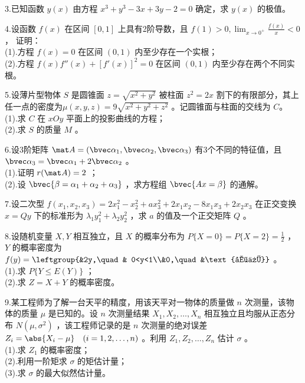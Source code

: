 3.已知函数 $y(x)$ 由方程 $x^3+y^3-3x+3y-2=0$  确定，求 $y(x)$ 的极值。

4.设函数  $f(x)$ 在区间 $[0,1]$  上具有2阶导数，且 $\displaystyle f(1)>0,\lim_{x \to 0^+}\frac{f(x)}{x}<0$ ，  证明：\\
(1).方程 $f(x)=0$  在区间 $(0,1)$ 内至少存在一个实根；\\
(2).方程 $f(x)f''(x)+[f'(x)]^2=0$ 在区间 $(0,1)$ 内至少存在两个不同实根。

5.设薄片型物体 $S$ 是圆锥面  $z=\sqrt{x^2+y^2}$ 被柱面 $z^2=2x$  割下的有限部分，其上任一点的密度为$\mu(x,y,z)=9\sqrt{x^2+y^2+z^2}$   。记圆锥面与柱面的交线为 $C$。\\
(1).求 $C$ 在 $xOy$  平面上的投影曲线的方程；\\
(2).求 $S$ 的质量 $M$ 。

6.设3阶矩阵 $\mat A=(\bvec \alpha_1,\bvec \alpha_2,\bvec \alpha_3)$  有3个不同的特征值，且 $\bvec \alpha_3=\bvec \alpha_1+2\bvec \alpha_2$ 。\\
(1).证明 $r(\mat A)=2$ ；\\
(2).设 $\bvec{\beta=\alpha_1+\alpha_2+\alpha_3}$  ，求方程组 $\bvec{Ax=\beta}$  的通解。

7.设二次型  $f(x_1,x_2,x_3)=2x_1^2-x_2^2+ax_3^2+2x_1x_2-8x_1x_3+2x_2x_3$ 在正交变换  $x=Qy$ 下的标准形为 $\lambda_1y_1^2+\lambda_2y_2^2$  ，求 $a$ 的值及一个正交矩阵 $Q$ 。

8.设随机变量 $X,Y$  相互独立，且 $X$  的概率分布为 $\displaystyle P\{X=0\}=P\{X=2\}=\frac{1}{2}$  ， $Y$ 的概率密度为 $f(y)=\leftgroup{&2y,\quad & 0<y<1\\&0,\quad &\text{其他}}$ 。\\
(1).求 $P\{Y \le E(Y)\}$ ；\\
(2).求 $Z=X+Y$ 的概率密度。

9.某工程师为了解一台天平的精度，用该天平对一物体的质量做 $n$ 次测量，该物体的质量 $\mu$ 是已知的。设 $n$ 次测量结果 $X_1,X_2,\dots,X_n$  相互独立且均服从正态分布 $N(\mu,\sigma^2)$ ，该工程师记录的是 $n$  次测量的绝对误差 $Z_i=\abs{X_i-\mu} \quad (i=1,2,\dots,n)$  。利用  $Z_1,Z_2,\dots,Z_n$ 估计 $\sigma$ 。\\
(1).求 $Z_1$ 的概率密度；\\
(2).利用一阶矩求 $\sigma$ 的矩估计量；\\
(3).求 $\sigma$ 的最大似然估计量。
